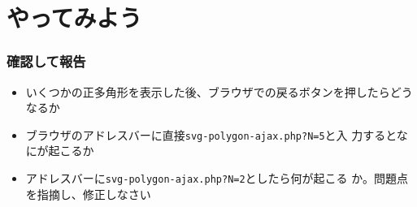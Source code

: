 \section{やってみよう}
\begin{frame}[containsverbatim]
 \frametitle{確認して報告}
 \begin{itemize}
  \item  いくつかの正多角形を表示した後、ブラウザでの戻るボタンを押したらどう
 なるか
  \item ブラウザのアドレスバーに直接\verb+svg-polygon-ajax.php?N=5+と入
        力するとなにが起こるか
	\item アドレスバーに\Verb+svg-polygon-ajax.php?N=2+としたら何が起こる
				か。問題点を指摘し、修正しなさい
 \end{itemize}
\end{frame}

\begin{frame}[containsverbatim]
\frametitle{}
\end{frame}


